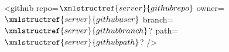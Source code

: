 <github repo=$\xmlstructref{server}{githubrepo}$ owner=$\xmlstructref{server}{githubuser}$ branch=$\xmlstructref{server}{githubbranch}$? path=$\xmlstructref{server}{githubpath}$? />
